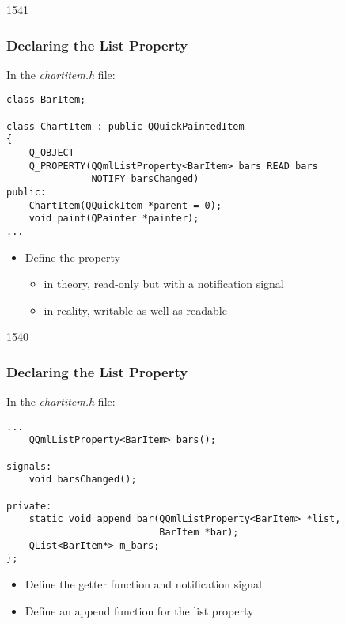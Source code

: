 \begin{slide}[fragile]{1541}\frametitle{Declaring the List Property}

In the \textit{chartitem.h} file:

\vspace*{0.5em}
\begin{lstlisting}
class BarItem;

class ChartItem : public QQuickPaintedItem
{
    Q_OBJECT
    Q_PROPERTY(QQmlListProperty<BarItem> bars READ bars
               NOTIFY barsChanged)
public:
    ChartItem(QQuickItem *parent = 0);
    void paint(QPainter *painter);
...
\end{lstlisting}

\vspace*{0.5em}
\begin{itemize}
\item Define the  property
  \begin{itemize}
  \item in theory, read-only but with a notification signal
  \item in reality, writable as well as readable
  \end{itemize}
\end{itemize}

\end{slide}

\begin{slide}[fragile]{1540}\frametitle{Declaring the List Property}

In the \textit{chartitem.h} file:

\vspace*{0.5em}
\begin{lstlisting}
...
    QQmlListProperty<BarItem> bars();

signals:
    void barsChanged();

private:
    static void append_bar(QQmlListProperty<BarItem> *list,
                           BarItem *bar);
    QList<BarItem*> m_bars;
};
\end{lstlisting}

\vspace*{0.5em}
\begin{itemize}
\item Define the getter function and notification signal
\item Define an append function for the list property
\end{itemize}

\end{slide}

